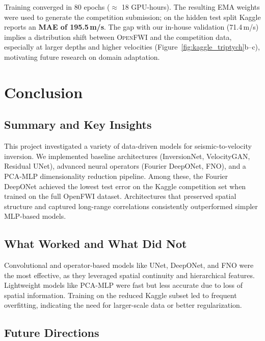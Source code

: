 \documentclass{article}
\newcommand{\instructions}[1]{{\color{blue} #1}}
\begin{document}
Training converged in $80$ epochs (\(\approx\) 18 GPU-hours).  
The resulting EMA weights were used to generate the competition submission; on the hidden test split Kaggle reports an \textbf{MAE of 195.5\,m/s}.  
The gap with our in-house validation (71.4\,m/s) implies a distribution shift between \textsc{OpenFWI} and the competition data, especially at larger depths and higher velocities (Figure~\ref{fig:kaggle_triptych}b–c), motivating future research on domain adaptation.

\section{Conclusion}

\subsection{Summary and Key Insights}

This project investigated a variety of data-driven models for seismic-to-velocity inversion. We implemented baseline architectures (InversionNet, VelocityGAN, Residual UNet), advanced neural operators (Fourier DeepONet, FNO), and a PCA-MLP dimensionality reduction pipeline. Among these, the Fourier DeepONet achieved the lowest test error on the Kaggle competition set when trained on the full OpenFWI dataset. Architectures that preserved spatial structure and captured long-range correlations consistently outperformed simpler MLP-based models.

\subsection{What Worked and What Did Not}

Convolutional and operator-based models like UNet, DeepONet, and FNO were the most effective, as they leveraged spatial continuity and hierarchical features. Lightweight models like PCA-MLP were fast but less accurate due to loss of spatial information. Training on the reduced Kaggle subset led to frequent overfitting, indicating the need for larger-scale data or better regularization.

\subsection{Future Directions}
\end{document}
